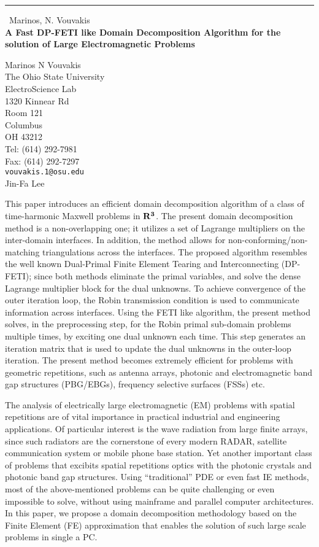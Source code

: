 \documentclass{report}
\begin{document}
\begin{center}
\rule{6in}{1pt} \
{\large Marinos, N. Vouvakis \\
{\bf  A Fast DP-FETI like Domain Decomposition Algorithm for the solution of Large Electromagnetic Problems}}

Marinos N Vouvakis \\ The Ohio State University \\ ElectroScience Lab \\ 1320 Kinnear Rd  \\ Room 121 \\ Columbus \\ OH 43212 \\ Tel: (614) 292-7981 \\ Fax: (614) 292-7297
\\
{\tt vouvakis.1@osu.edu}\\
Jin-Fa
 Lee\end{center}

This paper introduces an efficient domain decomposition
algorithm of a class of time-harmonic Maxwell problems in $\bf{R}^3$. The
present domain decomposition method is a non-overlapping one; it
utilizes a set of Lagrange multipliers on the inter-domain interfaces.
In addition, the method allows for non-conforming/non-matching
triangulations across the interfaces. The proposed algorithm resembles
the well known Dual-Primal Finite Element Tearing and Interconnecting
(DP-FETI); since both methods eliminate the primal variables, and
solve the dense Lagrange multiplier block for the dual unknowns. To
achieve convergence of the outer iteration loop, the Robin
transmission condition is used to communicate information across
interfaces. Using the FETI like algorithm, the present method solves,
in the preprocessing step, for the Robin primal sub-domain problems
multiple times, by exciting one dual unknown each time. This step
generates an iteration matrix that is used to update the dual unknowns
in the outer-loop iteration. The present method becomes extremely
efficient for problems with geometric repetitions, such as antenna
arrays, photonic and electromagnetic band gap structures (PBG/EBGs),
frequency selective surfaces (FSSs) etc.

The analysis of electrically large electromagnetic (EM) problems with
spatial repetitions are of vital importance in practical industrial
and engineering applications. Of particular interest is the wave
radiation from large finite arrays, since such radiators are the
cornerstone of every modern RADAR, satellite communication system or
mobile phone base station. Yet another important class of problems
that excibits spatial repetitions optics with the photonic
crystals and photonic band gap structures. Using ``traditional'' PDE
or even fast IE methods, most of the above-mentioned problems can be
quite challenging or even impossible to solve, without using mainframe
and parallel computer architectures. In this paper, we propose a
domain decomposition methodology based on the Finite Element (FE)
approximation that enables the solution of such large scale problems
in single a PC.
\end{document}
